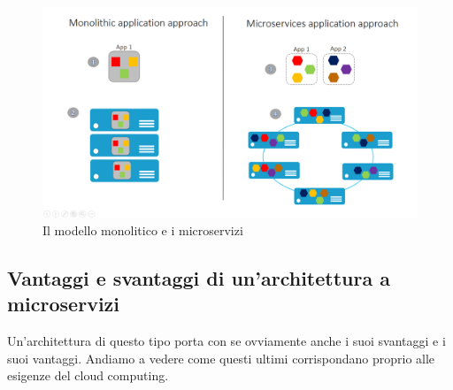 \begin{figure}[h!]
	\centering
	\includegraphics[width=\textwidth,keepaspectratio=true]{capitoli/imgs/monosvmicro.png}
	\caption{Il modello monolitico e i microservizi}
\end{figure}

\subsection{Vantaggi e svantaggi di un'architettura a microservizi}
Un'architettura di questo tipo porta con se ovviamente anche i suoi svantaggi e i suoi vantaggi. Andiamo a vedere come questi ultimi corrispondano proprio alle esigenze del cloud computing.

